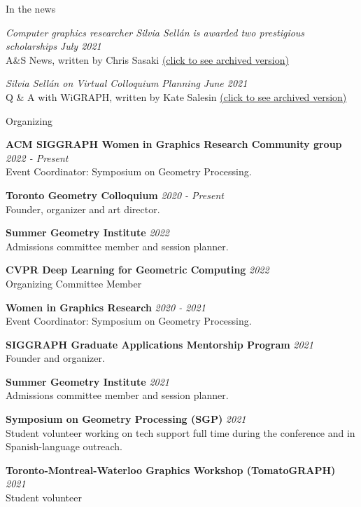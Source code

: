 \documentclass{resume}
\newcommand{\cvitem}[3]{
    {\bf #1} \hfill {\em \small #2} \\ 
    {\small#3 }
}
\begin{document}
\begin{rSection}{In the news}

{\it Computer graphics researcher Silvia Sellán is awarded two prestigious scholarships} \hfill {\small \it July 2021}\\ 
{\small A\&S News, written by Chris Sasaki \href{https://web.cs.toronto.edu/news-events/news/silvia-sellan-scholarships}{(click to see archived version)}} 

{\it Silvia Sellán on Virtual Colloquium Planning} \hfill {\small \it June 2021}\\ 
{\small Q \& A with WiGRAPH, written by Kate Salesin \href{https://www.wigraph.org/spotlights/silvia-sellan-on-virtual-colloquium-planning/}{(click to see archived version)}} 

\end{rSection}

\begin{rSection}{Organizing}

\cvitem{ACM SIGGRAPH Women in Graphics Research Community group}{2022 - Present}{Event Coordinator: Symposium on Geometry Processing.}
    
\cvitem{Toronto Geometry Colloquium}{2020 - Present}{Founder, organizer and art director.}

\cvitem{Summer Geometry Institute}{2022} 
{Admissions committee member and session planner.}

\cvitem{CVPR Deep Learning for Geometric Computing}{2022} 
{Organizing Committee Member}

\cvitem{Women in Graphics Research}{2020 - 2021}{Event Coordinator: Symposium on Geometry Processing.}

\cvitem{SIGGRAPH Graduate Applications Mentorship Program}{2021} 
{Founder and organizer.}

\cvitem{Summer Geometry Institute}{2021} 
{Admissions committee member and session planner.}

\cvitem{Symposium on Geometry Processing (SGP)}{2021} 
{Student volunteer working on tech support full time during the conference and in Spanish-language outreach.}

\cvitem{Toronto-Montreal-Waterloo Graphics Workshop (TomatoGRAPH)}{2021} 
{Student volunteer}





\end{rSection}
\end{document}
